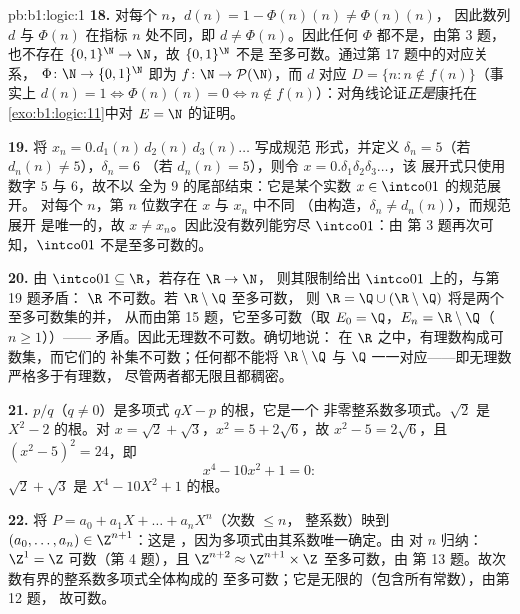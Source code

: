\begin{solution}{pb:b1:logic:1}
\textbf{18.} 对每个 $n$，$d(n) = 1 - \Phi(n)(n) \neq \Phi(n)(n)$，
因此数列 $d$ 与 $\Phi(n)$ 在指标 $n$ 处不同，即 $d \neq
\Phi(n)$。因此任何 $\Phi$ 都不是，由第 3 题，
也不存在 $\{0,1\}^{\N} \to \N$，故 $\{0,1\}^{\N}$ 不是
至多可数。通过第 17 题中的对应关系， $\Phi
\colon \N \to \{0,1\}^{\N}$ 即为 $f \colon \N \to
\mathcal{P}(\N)$，而 $d$ 对应 $D = \{n : n
\notin f(n)\}$（事实上 $d(n) = 1 \iff \Phi(n)(n) = 0 \iff n \notin
f(n)$）：对角线论证\emph{正是}康托在
\cref{exo:b1:logic:11}中对 $E = \N$ 的证明。

\textbf{19.} 将 $x_n = 0.d_1(n)\,d_2(n)\,d_3(n)\dots$ 写成规范
形式，并定义 $\delta_n = 5$（若 $d_n(n) \neq 5$），$\delta_n = 6$
（若 $d_n(n) = 5$），则令 $x = 0.\delta_1\delta_2\delta_3\dots$，该
展开式只使用数字 $5$ 与 $6$，故不以
全为 $9$ 的尾部结束：它是某个实数 $x \in \intco01$ 的规范展开。
对每个 $n$，第 $n$ 位数字在 $x$ 与 $x_n$ 中不同
（由构造，$\delta_n \neq d_n(n)$），而规范展开
是唯一的，故 $x \neq x_n$。因此没有数列能穷尽 $\intco01$：由
第 3 题再次可知，$\intco01$ 不是至多可数的。

\textbf{20.} 由 $\intco01 \subseteq \R$，若存在 $\R \to \N$，
则其限制给出 $\intco01$ 上的，与第 19 题矛盾：
$\R$ 不可数。若 $\R \setminus \Q$ 至多可数，
则 $\R = \Q \cup (\R \setminus \Q)$ 将是两个至多可数集的并，
从而由第 15 题，它至多可数（取
$E_0 = \Q$，$E_n = \R \setminus \Q$（$n \geq 1$））——
矛盾。因此无理数不可数。确切地说：
在 $\R$ 之中，有理数构成可数集，而它们的
补集不可数；任何都不能将 $\R
\setminus \Q$ 与 $\Q$ 一一对应——即无理数严格多于有理数，
尽管两者都无限且都稠密。

\textbf{21.} $p/q$（$q \neq 0$）是多项式 $qX - p$ 的根，它是一个
非零整系数多项式。$\sqrt 2$ 是
$X^2 - 2$ 的根。对 $x = \sqrt 2 + \sqrt 3$，$x^2 = 5 + 2\sqrt 6$，故
$x^2 - 5 = 2\sqrt 6$，且 $(x^2 - 5)^2 = 24$，即\
\[
x^4 - 10x^2 + 1 = 0 :
\]
$\sqrt 2 + \sqrt 3$ 是 $X^4 - 10X^2 + 1$ 的根。

\textbf{22.} 将 $P = a_0 + a_1X + \dots + a_nX^n$（次数 $\leq n$，
整系数）映到 $(a_0, \dots, a_n) \in \Z^{n+1}$：这是
，因为多项式由其系数唯一确定。由
对 $n$ 归纳：$\Z^1 = \Z$ 可数（第 4 题），且
$\Z^{n+2} \approx \Z^{n+1} \times \Z$ 至多可数，由
第 13 题。故次数有界的整系数多项式全体构成的
至多可数；它是无限的（包含所有常数），由第 12 题，
故可数。


\end{solution}
